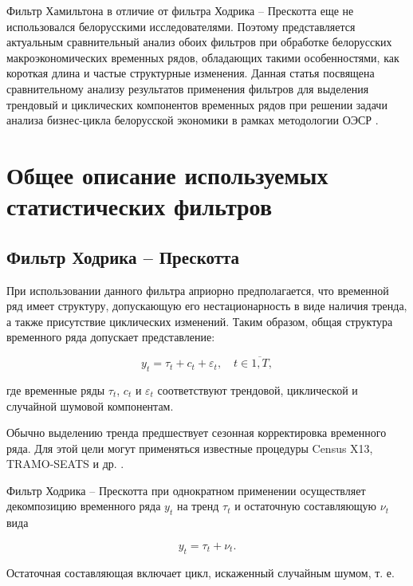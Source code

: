 \documentclass[a4paper,14pt]{extreport}
\begin{document}
	Фильтр Хамильтона в отличие от фильтра Ходрика -- Прескотта еще не использовался белорусскими исследователями. Поэтому представляется актуальным сравнительный анализ обоих фильтров при обработке белорусских макроэкономических временных рядов, обладающих такими особенностями, как короткая длина и частые структурные изменения. Данная статья посвящена сравнительному анализу результатов применения фильтров для выделения трендовый и циклических компонентов временных рядов при решении задачи анализа бизнес-цикла белорусской экономики в рамках методологии ОЭСР \cite{oecdCycleExtraction, esiMaking}. 
	
	\section{Общее описание используемых статистических фильтров}
	
	\subsection{Фильтр Ходрика -- Прескотта}
	
	При использовании данного фильтра априорно предполагается, что временной ряд   имеет структуру, допускающую его нестационарность в виде наличия тренда, а также присутствие циклических изменений. Таким образом, общая структура временного ряда допускает представление:
	
	\begin{equation}
	y_t = \tau_t + c_t + \varepsilon_t, \quad t \in \overline{1,T},
	\label{eq:decomposition}
	\end{equation}
	
	где временные ряды  $\tau_t$, $c_t$ и $\varepsilon_t$ соответствуют трендовой, циклической и случайной шумовой компонентам. 
	
	Обычно выделению тренда предшествует сезонная корректировка временного ряда. Для этой цели могут применяться известные процедуры Census X13, TRAMO-SEATS и др. \cite{oecdCycleExtraction, esiMakingAlt}. 
	
	Фильтр Ходрика -- Прескотта при однократном применении осуществляет декомпозицию временного ряда $y_t$ на тренд $\tau_t$ и остаточную составляющую $\nu_t$ вида
	
	\begin{equation}
	y_t = \tau_t + \nu_t .
	\label{eq:decomp1}
	\end{equation}
	
	Остаточная составляющая включает цикл, искаженный случайным шумом, т. е. 
	
\end{document}
